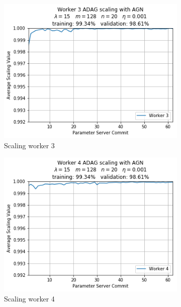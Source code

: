 \begin{figure}
\begin{subfigure}{.24\textwidth}
    \includegraphics[width=\linewidth]{resources/images/plots/adag_agn_mnist/epoch_40/15/001/scaling/worker_3}
    \caption{Scaling worker 3}
  \end{subfigure}
  \begin{subfigure}{.24\textwidth}
    \centering
    \includegraphics[width=\linewidth]{resources/images/plots/adag_agn_mnist/epoch_40/15/001/scaling/worker_4}
    \caption{Scaling worker 4}
  \end{subfigure}
  \begin{subfigure}{.24\textwidth}
    \centering

\end{subfigure}
\end{figure}
